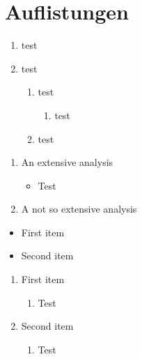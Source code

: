 \documentclass[10pt, a4paper]{article}
\begin{document}
\section{Auflistungen}
\blindtext

\begin{enumerate}
  \item test
  \item test
  \begin{enumerate}
    \item test
    \begin{enumerate}
      \item test
    \end{enumerate}
    \item test
  \end{enumerate}
\end{enumerate}

\begin{enumerate}
  \item  An extensive analysis 
   \begin{itemize}
     \item Test
   \end{itemize}
 \item A not so extensive analysis
\end{enumerate}

\blindtext

\begin{itemize}
  \item First item
  \item[\ding{43}] Second item
\end{itemize}


\begin{enumerate}
  \item First item
  \begin{enumerate}
    \item Test
  \end{enumerate}
  \item Second item
  \begin{enumerate}
    \item Test
  \end{enumerate}
\end{enumerate}
\end{document}
